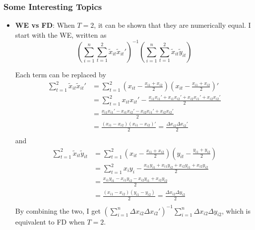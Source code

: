 \documentclass[12pt]{article}
\theoremstyle{definition}
\theoremstyle{property}
\theoremstyle{assumption}
\theoremstyle{example}
\theoremstyle{comment}
\begin{document}
\subsubsection{Some Interesting Topics}
\begin{itemize}
\item \textbf{WE vs FD}: When $T=2$, it can be shown that they are numerically equal. I start with the WE, written as
\[
\left(\sum_{i=1}^n\sum_{t=1}^2\tilde{x}_{it}\tilde{x}_{it}' \right)^{-1}\left(\sum_{i=1}^n\sum_{t=1}^2\tilde{x}_{it}\tilde{y}_{it} \right)
\]\par
Each term can be replaced by
\[
\begin{aligned}
\sum_{t=1}^2\tilde{x}_{it}\tilde{x}_{it}'&=\sum_{t=1}^2\left(x_{it}-\frac{x_{i1}+x_{i2}}{2}\right)\left(x_{it}-\frac{x_{i1}+x_{i2}}{2}\right)'\\
&=\sum_{t=1}^2x_{it}x_{it}'-\frac{x_{i1}x_{i1}'+x_{i1}x_{i2}'+x_{i2}x_{i1}'+x_{i2}x_{i2}'}{2}\\
&=\frac{x_{i1}x_{i1}'-x_{i1}x_{i2}'-x_{i2}x_{i1}'+x_{i2}x_{i2}'}{2}\\
&=\frac{(x_{i1}-x_{i2})(x_{i1}-x_{i2})'}{2}=\frac{\Delta x_{i2} \Delta x_{i2}'}{2}\\
\end{aligned}
\]
and 
\[
\begin{aligned}
\sum_{t=1}^2\tilde{x}_{it}\tilde{y}_{it}&=\sum_{t=1}^2\left(x_{it}-\frac{x_{i1}+x_{i2}}{2}\right)\left(y_{it}-\frac{y_{i1}+y_{i2}}{2}\right)\\
&=\sum_{t=1}^2 x_iy_i - \frac{x_{i1}y_{i1}+x_{i1}y_{i2}+x_{i2}y_{i1}+x_{i2}y_{i2}}{2}\\
&=\frac{x_{i1}y_{i1}-x_{i1}y_{i2}-x_{i2}y_{i1}+x_{i2}y_{i2}}{2}\\
&=\frac{(x_{i1}-x_{i2})(y_{i1}-y_{i2})}{2}=\frac{\Delta x_{i2} \Delta y_{i2}}{2}\\
\end{aligned}
\]
By combining the two, I get $\left(\sum_{i=1}^n \Delta x_{i2}\Delta x_{i2}'\right)^{-1}\sum_{i=1}^n \Delta x_{i2}\Delta y_{i2}$, which is equivalent to FD when $T=2$. 


\end{itemize}
\end{document}
